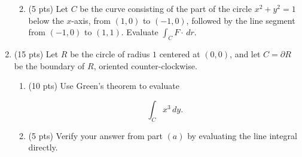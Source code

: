 \documentclass[12 pt]{report}
\begin{document}
\begin{enumerate}
\begin{enumerate}
\vfill 

\item (5 pts) Let $C$ be the curve consisting of the part of the circle $x^2 + y^2 = 1$ below the $x$-axis, from $(1,0)$ to $(-1,0)$, followed by the line segment from $(-1,0)$ to $(1,1)$. Evaluate $\int_C F \cdot \, dr$. 

\vfill 

\end{enumerate}

\newpage 

\item (15 pts) Let $R$ be the circle of radius $1$ centered at $(0,0)$, and let $C = \partial R$ be the boundary of $R$, oriented counter-clockwise. 

\begin{enumerate} \item (10 pts) Use Green's theorem to evaluate

\[
\int_C x^3 \, dy.
\]

\vfill 

\item (5 pts) Verify your answer from part $(a)$ by evaluating the line integral directly. 

\vfill 

\end{enumerate} 


\newpage 


\end{enumerate}
\end{document}
